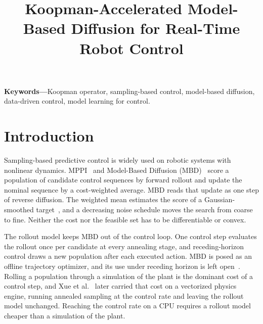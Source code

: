 \documentclass[letterpaper,10pt,conference]{ieeeconf}
\begin{document}
\title{Koopman-Accelerated Model-Based Diffusion for Real-Time Robot Control}


\maketitle

\begin{abstract}

\end{abstract}

\noindent\textbf{Keywords---}Koopman operator, sampling-based control,
model-based diffusion, data-driven control, model learning for control.

\section{Introduction}\label{sec:intro}

Sampling-based predictive control is widely used on robotic systems with nonlinear dynamics.
MPPI~\cite{kappen2005, theodorou2010, williams2017mppi, williams2016aggressive} and Model-Based Diffusion (MBD)~\cite{pan2024model} score a population of candidate control sequences by forward rollout and update the nominal sequence by a cost-weighted average.
MBD reads that update as one step of reverse diffusion.
The weighted mean estimates the score of a Gaussian-smoothed target~\cite{song2019generative, song2020score}, and a decreasing noise schedule moves the search from coarse to fine.
Neither the cost nor the feasible set has to be differentiable or convex.

The rollout model keeps MBD out of the control loop.
One control step evaluates the rollout once per candidate at every annealing stage, and receding-horizon control draws a new population after each executed action.
MBD is posed as an offline trajectory optimizer, and its use under receding horizon is left open~\cite{pan2024model}.
Rolling a population through a simulation of the plant is the dominant cost of a control step, and Xue et al.~\cite{xue2025full} later carried that cost on a vectorized physics engine, running annealed sampling at the control rate and leaving the rollout model unchanged.
Reaching the control rate on a CPU requires a rollout model cheaper than a simulation of the plant.
\end{document}

